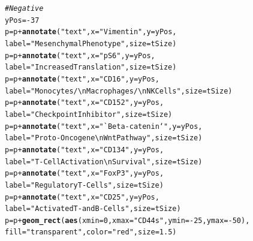 \documentclass[a4paper]{article}\usepackage[]{graphicx}\usepackage[]{color}
\makeatletter
\newcommand{\hlnum}[1]{\textcolor[rgb]{0.686,0.059,0.569}{#1}}%
\newcommand{\hlstr}[1]{\textcolor[rgb]{0.192,0.494,0.8}{#1}}%
\newcommand{\hlcom}[1]{\textcolor[rgb]{0.678,0.584,0.686}{\textit{#1}}}%
\newcommand{\hlopt}[1]{\textcolor[rgb]{0,0,0}{#1}}%
\newcommand{\hlstd}[1]{\textcolor[rgb]{0.345,0.345,0.345}{#1}}%
\newcommand{\hlkwb}[1]{\textcolor[rgb]{0.69,0.353,0.396}{#1}}%
\newcommand{\hlkwc}[1]{\textcolor[rgb]{0.333,0.667,0.333}{#1}}%
\newcommand{\hlkwd}[1]{\textcolor[rgb]{0.737,0.353,0.396}{\textbf{#1}}}%
\newenvironment{kframe}{%
 \def\at@end@of@kframe{}%
 \ifinner\ifhmode%
  \def\at@end@of@kframe{\end{minipage}}%
  \begin{minipage}{\columnwidth}%
 \fi\fi%
 \def\FrameCommand##1{\hskip\@totalleftmargin \hskip-\fboxsep
 \colorbox{shadecolor}{##1}\hskip-\fboxsep
     \hskip-\linewidth \hskip-\@totalleftmargin \hskip\columnwidth}%
 \MakeFramed {\advance\hsize-\width
   \@totalleftmargin\z@ \linewidth\hsize
   \@setminipage}}%
 {\par\unskip\endMakeFramed%
 \at@end@of@kframe}
\newenvironment{knitrout}{}{} %
\makeatother
\begin{document}
\begin{knitrout}
\begin{kframe}
\begin{alltt}
\hlcom{# Negative}
\hlstd{yPos} \hlkwb{=} \hlopt{-}\hlnum{37}
\hlstd{p} \hlkwb{=} \hlstd{p} \hlopt{+} \hlkwd{annotate}\hlstd{(}\hlstr{"text"}\hlstd{,} \hlkwc{x} \hlstd{=} \hlstr{"Vimentin"}\hlstd{,} \hlkwc{y} \hlstd{= yPos,}
                       \hlkwc{label} \hlstd{=} \hlstr{"Mesenchymal Phenotype"}\hlstd{,} \hlkwc{size} \hlstd{= tSize)}
\hlstd{p} \hlkwb{=} \hlstd{p} \hlopt{+} \hlkwd{annotate}\hlstd{(}\hlstr{"text"}\hlstd{,} \hlkwc{x} \hlstd{=} \hlstr{"pS6"}\hlstd{,} \hlkwc{y} \hlstd{= yPos,}
                       \hlkwc{label} \hlstd{=} \hlstr{"Increased Translation"}\hlstd{,} \hlkwc{size} \hlstd{= tSize)}
\hlstd{p} \hlkwb{=} \hlstd{p} \hlopt{+} \hlkwd{annotate}\hlstd{(}\hlstr{"text"}\hlstd{,} \hlkwc{x} \hlstd{=} \hlstr{"CD16"}\hlstd{,} \hlkwc{y} \hlstd{= yPos,}
                       \hlkwc{label} \hlstd{=} \hlstr{"Monocytes/\textbackslash{}n Macrophages/\textbackslash{}n NK Cells"}\hlstd{,} \hlkwc{size} \hlstd{= tSize)}
\hlstd{p} \hlkwb{=} \hlstd{p} \hlopt{+} \hlkwd{annotate}\hlstd{(}\hlstr{"text"}\hlstd{,} \hlkwc{x} \hlstd{=} \hlstr{"CD152"}\hlstd{,} \hlkwc{y} \hlstd{= yPos,}
                       \hlkwc{label} \hlstd{=} \hlstr{"Checkpoint Inhibitor"}\hlstd{,} \hlkwc{size} \hlstd{= tSize)}
\hlstd{p} \hlkwb{=} \hlstd{p} \hlopt{+} \hlkwd{annotate}\hlstd{(}\hlstr{"text"}\hlstd{,} \hlkwc{x} \hlstd{=} \hlstr{"`Beta-catenin`"}\hlstd{,} \hlkwc{y} \hlstd{= yPos,}
                       \hlkwc{label} \hlstd{=} \hlstr{"Proto-Oncogene\textbackslash{}n Wnt Pathway"}\hlstd{,} \hlkwc{size} \hlstd{= tSize)}
\hlstd{p} \hlkwb{=} \hlstd{p} \hlopt{+} \hlkwd{annotate}\hlstd{(}\hlstr{"text"}\hlstd{,} \hlkwc{x} \hlstd{=} \hlstr{"CD134"}\hlstd{,} \hlkwc{y} \hlstd{= yPos,}
                       \hlkwc{label} \hlstd{=} \hlstr{"T-Cell Activation\textbackslash{}n Survival"}\hlstd{,} \hlkwc{size} \hlstd{= tSize)}
\hlstd{p} \hlkwb{=} \hlstd{p} \hlopt{+} \hlkwd{annotate}\hlstd{(}\hlstr{"text"}\hlstd{,} \hlkwc{x} \hlstd{=} \hlstr{"FoxP3"}\hlstd{,} \hlkwc{y} \hlstd{= yPos,}
                       \hlkwc{label} \hlstd{=} \hlstr{"Regulatory T-Cells"}\hlstd{,} \hlkwc{size} \hlstd{= tSize)}
\hlstd{p} \hlkwb{=} \hlstd{p} \hlopt{+} \hlkwd{annotate}\hlstd{(}\hlstr{"text"}\hlstd{,} \hlkwc{x} \hlstd{=} \hlstr{"CD25"}\hlstd{,} \hlkwc{y} \hlstd{= yPos,}
                       \hlkwc{label} \hlstd{=} \hlstr{"Activated T- and B-Cells"}\hlstd{,} \hlkwc{size} \hlstd{= tSize)}
\hlstd{p} \hlkwb{=} \hlstd{p} \hlopt{+} \hlkwd{geom_rect}\hlstd{(}\hlkwd{aes}\hlstd{(}\hlkwc{xmin} \hlstd{=} \hlnum{0}\hlstd{,} \hlkwc{xmax} \hlstd{=} \hlstr{"CD44s"}\hlstd{,} \hlkwc{ymin} \hlstd{=} \hlopt{-}\hlnum{25}\hlstd{,} \hlkwc{ymax} \hlstd{=} \hlopt{-}\hlnum{50}\hlstd{),}
               \hlkwc{fill} \hlstd{=} \hlstr{"transparent"}\hlstd{,} \hlkwc{color} \hlstd{=} \hlstr{"red"}\hlstd{,} \hlkwc{size} \hlstd{=} \hlnum{1.5}\hlstd{)}


\end{alltt}
\end{kframe}
\end{knitrout}
\end{document}
